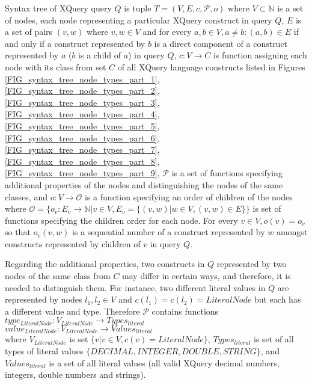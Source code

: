 \begin{define}
\label{DEF_syntax_tree}
Syntax tree of XQuery query $Q$ is tuple $T = (V, E, c, \mathcal{P}, o)$ where $V \subset \mathbb{N}$ is a set of nodes, each node representing a particular XQuery construct in query $Q$, $E$ is a set of pairs $(v, w)$ where $v,w \in V$ and for every $a, b \in V, a \neq b: (a, b) \in E$ if and only if a construct represented by $b$ is a direct component of a construct represented by $a$ ($b$ is a child of $a$) in query $Q$, $c: V \rightarrow C$ is function assigning each node with its class from set $C$ of all XQuery language constructs listed in Figures \ref{FIG_syntax_tree_node_types_part_1}, \ref{FIG_syntax_tree_node_types_part_2}, \ref{FIG_syntax_tree_node_types_part_3}, \ref{FIG_syntax_tree_node_types_part_4}, \ref{FIG_syntax_tree_node_types_part_5}, \ref{FIG_syntax_tree_node_types_part_6}, \ref{FIG_syntax_tree_node_types_part_7}, \ref{FIG_syntax_tree_node_types_part_8}, \ref{FIG_syntax_tree_node_types_part_9}, $\mathcal{P}$ is a set of functions specifying additional properties of the nodes and distinguishing the nodes of the same classes, and $o : V \rightarrow \mathcal{O}$ is a function specifying an order of children of the nodes where $\mathcal{O} = \{o_v : E_v \rightarrow \mathbb{N} | v \in V, E_v = \{(v, w) | w \in V, (v,w) \in E\}\}$ is set of functions specifying the children order for each node. For every $v \in V, o(v) = o_v$ so that $o_v(v,w)$ is a sequential number of a construct represented by $w$ amongst constructs represented by children of $v$ in query $Q$. 
\end{define}

Regarding the additional properties, two constructs in $Q$ represented by two nodes of the same class from $C$ may differ in certain ways, and therefore, it is needed to distinguish them. For instance, two different literal values in $Q$ are represented by nodes $l_1, l_2 \in V$ and $c(l_1) = c(l_2) = LiteralNode$ but each has a different value and type. Therefore $\mathcal{P}$ contains functions \\
$type_{LiteralNode}: V_{LiteralNode} \rightarrow Types_{literal}$ \\
$value_{LiteralNode}: V_{LiteralNode} \rightarrow Values_{literal}$ \\
where $V_{LiteralNode}$ is set $\{v | v \in V, c(v) = LiteralNode\}$, $Types_{literal}$ is set of all types of literal values $\{DECIMAL, INTEGER, DOUBLE, STRING\}$, and $Values_{literal}$ is a set of all literal values (all valid XQuery decimal numbers, integers, double numbers and strings).

